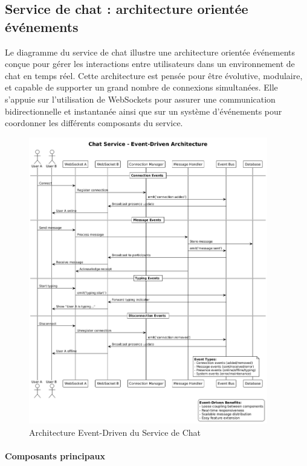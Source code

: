 \documentclass{rapportPfe}
\begin{document}
\FloatBarrier
\subsection{Service de chat : architecture orientée événements}

Le diagramme du service de chat illustre une architecture orientée événements conçue pour gérer les interactions entre utilisateurs dans un environnement de chat en temps réel. Cette architecture est pensée pour être évolutive, modulaire, et capable de supporter un grand nombre de connexions simultanées. Elle s'appuie sur l'utilisation de WebSockets pour assurer une communication bidirectionnelle et instantanée ainsi que sur un système d'événements pour coordonner les différents composants du service.

\begin{figure}[htbp]
    \centering
    \includegraphics[width=0.93\textwidth]{diagrams/diagram4.png}
    \caption{Architecture Event-Driven du Service de Chat}
    \label{fig:chat-service-architecture}
\end{figure}

\paragraph{Composants principaux}
\end{document}
